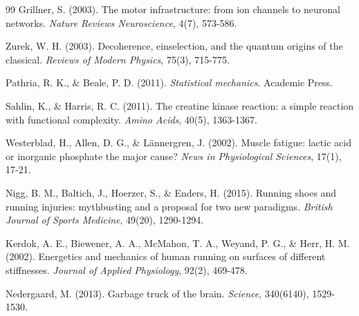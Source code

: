 \documentclass[12pt,twocolumn]{article}
\begin{document}
\begin{thebibliography}{99}
Grillner, S. (2003). The motor infrastructure: from ion channels to neuronal networks. \textit{Nature Reviews Neuroscience}, 4(7), 573-586.

Zurek, W. H. (2003). Decoherence, einselection, and the quantum origins of the classical. \textit{Reviews of Modern Physics}, 75(3), 715-775.

Pathria, R. K., \& Beale, P. D. (2011). \textit{Statistical mechanics}. Academic Press.

Sahlin, K., \& Harris, R. C. (2011). The creatine kinase reaction: a simple reaction with functional complexity. \textit{Amino Acids}, 40(5), 1363-1367.

Westerblad, H., Allen, D. G., \& Lännergren, J. (2002). Muscle fatigue: lactic acid or inorganic phosphate the major cause? \textit{News in Physiological Sciences}, 17(1), 17-21.

Nigg, B. M., Baltich, J., Hoerzer, S., & Enders, H. (2015). Running shoes and running injuries: mythbusting and a proposal for two new paradigms. \textit{British Journal of Sports Medicine}, 49(20), 1290-1294.

Kerdok, A. E., Biewener, A. A., McMahon, T. A., Weyand, P. G., & Herr, H. M. (2002). Energetics and mechanics of human running on surfaces of different stiffnesses. \textit{Journal of Applied Physiology}, 92(2), 469-478.

Nedergaard, M. (2013). Garbage truck of the brain. \textit{Science}, 340(6140), 1529-1530.

\end{thebibliography}
\end{document}

